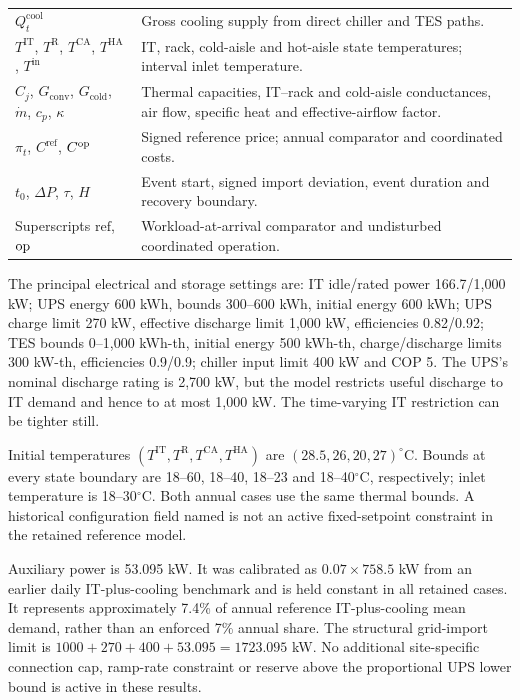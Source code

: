 \begin{longtable}{@{}p{}p{}@{}}
$Q_t^{\mathrm{cool}}$ & Gross cooling supply from direct chiller and TES paths.\\
$T^{\mathrm{IT}}$, $T^{\mathrm R}$, $T^{\mathrm{CA}}$, $T^{\mathrm{HA}}$, $T^{\mathrm{in}}$ & IT, rack, cold-aisle and hot-aisle state temperatures; interval inlet temperature.\\
$C_j$, $G_{\mathrm{conv}}$, $G_{\mathrm{cold}}$, $\dot m$, $c_p$, $\kappa$ & Thermal capacities, IT--rack and cold-aisle conductances, air flow, specific heat and effective-airflow factor.\\
$\pi_t$, $C^{\mathrm{ref}}$, $C^{\mathrm{op}}$ & Signed reference price; annual comparator and coordinated costs.\\
$t_0$, $\Delta P$, $\tau$, $H$ & Event start, signed import deviation, event duration and recovery boundary.\\
Superscripts $\mathrm{ref}$, $\mathrm{op}$ & Workload-at-arrival comparator and undisturbed coordinated operation.\\\bottomrule
\end{longtable}



The principal electrical and storage settings are: IT idle/rated power 166.7/1,000 kW; UPS energy 600 kWh, bounds 300--600 kWh, initial energy 600 kWh; UPS charge limit 270 kW, effective discharge limit 1,000 kW, efficiencies 0.82/0.92; TES bounds 0--1,000 kWh-th, initial energy 500 kWh-th, charge/discharge limits 300 kW-th, efficiencies 0.9/0.9; chiller input limit 400 kW and COP 5. The UPS's nominal discharge rating is 2,700 kW, but the model restricts useful discharge to IT demand and hence to at most 1,000 kW. The time-varying IT restriction can be tighter still.

Initial temperatures $(T^{\mathrm{IT}},T^{\mathrm R},T^{\mathrm{CA}},T^{\mathrm{HA}})$ are $(28.5,26,20,27)^{\circ}$C. Bounds at every state boundary are 18--60, 18--40, 18--23 and 18--40$^{\circ}$C, respectively; inlet temperature is 18--30$^{\circ}$C. Both annual cases use the same thermal bounds. A historical configuration field named  is not an active fixed-setpoint constraint in the retained reference model.

Auxiliary power is 53.095 kW. It was calibrated as $0.07\times758.5$ kW from an earlier daily IT-plus-cooling benchmark and is held constant in all retained cases. It represents approximately 7.4\% of annual reference IT-plus-cooling mean demand, rather than an enforced 7\% annual share. The structural grid-import limit is $1000+270+400+53.095=1723.095$ kW. No additional site-specific connection cap, ramp-rate constraint or reserve above the proportional UPS lower bound is active in these results.

